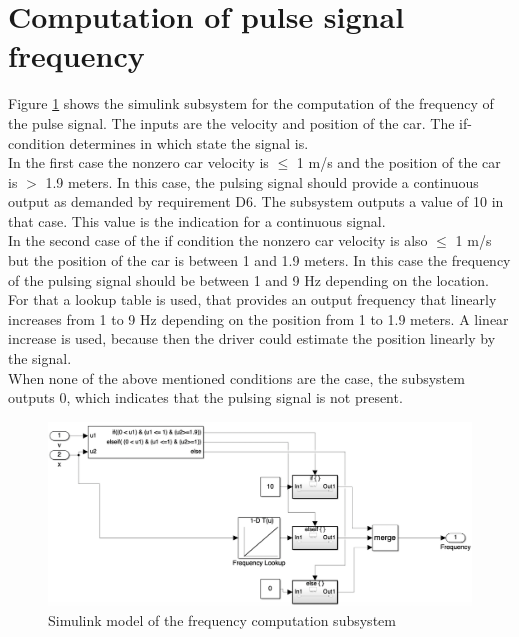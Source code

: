 \section{Computation of pulse signal frequency}\label{sec:D6Frequency}
Figure \ref{fig:D6_Frequency_Computation} shows the simulink subsystem for the computation of the frequency of the pulse signal.
The inputs are the velocity and position of the car.
The if-condition determines in which state the signal is.\\
In the first case the nonzero car velocity is $\leq$ 1 m/s and the position of the car is $>$ 1.9 meters.
In this case, the pulsing signal should provide a continuous output as demanded by requirement D6.
The subsystem outputs a value of 10 in that case.
This value is the indication for a continuous signal.\\
In the second case of the if condition the nonzero car velocity is also $\leq$ 1 m/s but the position of the car is between 1 and 1.9 meters.
In this case the frequency of the pulsing signal should be between 1 and 9 Hz depending on the location.
For that a lookup table is used, that provides an output frequency that linearly increases from 1 to 9 Hz depending on the position from 1 to 1.9 meters. A linear increase is used, because then the driver could estimate the position linearly by the signal.\\
When none of the above mentioned conditions are the case, the subsystem outputs 0, which indicates that the pulsing signal is not present.

\begin{figure}[H]
\centering
\includegraphics[width=1\textwidth]{images/D6_Frequency_Computation.png}
\caption{Simulink model of the frequency computation subsystem}
\label{fig:D6_Frequency_Computation}
\end{figure}

